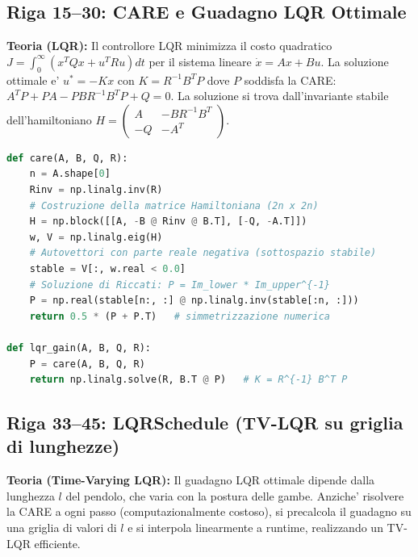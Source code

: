 \documentclass[11pt,a4paper]{report}
\begin{document}
\subsection{Riga 15--30: CARE e Guadagno LQR Ottimale}

\begin{theoryframe}
\textbf{Teoria (LQR):} Il controllore LQR minimizza il costo quadratico
$J = \int_0^\infty (x^T Q x + u^T R u) dt$ per il sistema lineare
$\dot x = Ax + Bu$. La soluzione ottimale e' $u^* = -Kx$ con
$K = R^{-1} B^T P$ dove $P$ soddisfa la CARE:
$A^T P + PA - PBR^{-1}B^T P + Q = 0$.
La soluzione si trova dall'invariante stabile dell'hamiltoniano
$H = \begin{pmatrix}A & -BR^{-1}B^T\\-Q & -A^T\end{pmatrix}$.
\end{theoryframe}

\begin{lstlisting}[language=Python, caption=solvers.py rr.\ 15-30: CARE e guadagno LQR]
def care(A, B, Q, R):
    n = A.shape[0]
    Rinv = np.linalg.inv(R)
    # Costruzione della matrice Hamiltoniana (2n x 2n)
    H = np.block([[A, -B @ Rinv @ B.T], [-Q, -A.T]])
    w, V = np.linalg.eig(H)
    # Autovettori con parte reale negativa (sottospazio stabile)
    stable = V[:, w.real < 0.0]
    # Soluzione di Riccati: P = Im_lower * Im_upper^{-1}
    P = np.real(stable[n:, :] @ np.linalg.inv(stable[:n, :]))
    return 0.5 * (P + P.T)   # simmetrizzazione numerica

def lqr_gain(A, B, Q, R):
    P = care(A, B, Q, R)
    return np.linalg.solve(R, B.T @ P)   # K = R^{-1} B^T P
\end{lstlisting}

\subsection{Riga 33--45: LQRSchedule (TV-LQR su griglia di lunghezze)}

\begin{theoryframe}
\textbf{Teoria (Time-Varying LQR):} Il guadagno LQR ottimale dipende dalla
lunghezza $l$ del pendolo, che varia con la postura delle gambe. Anziche'
risolvere la CARE a ogni passo (computazionalmente costoso), si precalcola
il guadagno su una griglia di valori di $l$ e si interpola linearmente
a runtime, realizzando un TV-LQR efficiente.
\end{theoryframe}
\end{document}
